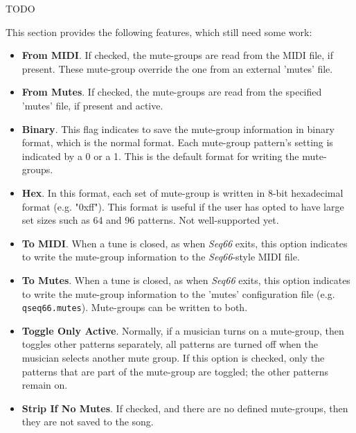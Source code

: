    TODO

   This section provides the following features, which still need some work:

      \begin{itemize}
         \item \textbf{From MIDI}.
            If checked, the mute-groups are read from the MIDI file, if
            present.  These mute-group override the one from an external
            'mutes' file.
         \item \textbf{From Mutes}.
            If checked, the mute-groups are read from the specified
            'mutes' file, if present and active.
         \item \textbf{Binary}.
            This flag indicates to save the mute-group information in
            binary format, which is the normal format.
            Each mute-group pattern's setting is indicated by a 0 or a 1.
            This is the default format for writing the mute-groups.
         \item \textbf{Hex}.
            In this format, each set of mute-group is written in 8-bit
            hexadecimal format (e.g. "0xff").  This format is useful if the
            user has opted to have large set sizes such as 64 and 96 patterns.
            Not well-supported yet.
         \item \textbf{To MIDI}.
            When a tune is closed, as when \textsl{Seq66} exits, this option
            indicates to write the mute-group information to the
            \textsl{Seq66}-style MIDI file.
         \item \textbf{To Mutes}.
            When a tune is closed, as when \textsl{Seq66} exits, this option
            indicates to write the mute-group information to the 'mutes'
            configuration file (e.g. \texttt{qseq66.mutes}).
            Mute-groups can be written to both.
         \item \textbf{Toggle Only Active}.
            Normally, if a musician turns on a mute-group, then toggles
            other patterns separately, all patterns are turned off
            when the musician selects another mute group.
            If this option is checked, only the patterns that are
            part of the mute-group are toggled; the other patterns remain
            on.
         \item \textbf{Strip If No Mutes}.
            If checked, and there are no defined mute-groups, then
            they are not saved to the song.
      \end{itemize}

